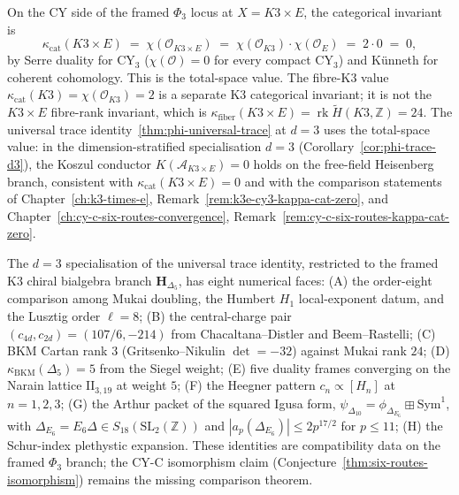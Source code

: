 \begin{remark}[\texorpdfstring{$\kappa_{\mathrm{cat}}(K3 \times E) = 0$}{kappa-cat(K3 x E) = 0}: per-route-independent CY-side invariant]
\label{rem:phiutp-kappa-cat-zero}
On the CY side of the framed $\Phi_3$ locus at $X = K3 \times E$, the categorical invariant is
\[
 \kappa_{\mathrm{cat}}(K3 \times E) \;=\; \chi(\mathcal{O}_{K3 \times E}) \;=\; \chi(\mathcal{O}_{K3}) \cdot \chi(\mathcal{O}_E) \;=\; 2 \cdot 0 \;=\; 0,
\]
by Serre duality for CY$_3$ ($\chi(\mathcal{O}) = 0$ for every compact CY$_3$) and K\"unneth for coherent cohomology. This is the total-space value. The fibre-K3 value $\kappa_{\mathrm{cat}}(K3) = \chi(\mathcal{O}_{K3}) = 2$ is a separate K3 categorical invariant; it is not the $K3\times E$ fibre-rank invariant, which is $\kappa_{\mathrm{fiber}}(K3\times E)=\operatorname{rk}\widetilde H(K3,\mathbb Z)=24$. The universal trace identity~\eqref{thm:phi-universal-trace} at $d = 3$ uses the total-space value: in the dimension-stratified specialisation $d = 3$ (Corollary~\ref{cor:phi-trace-d3}), the Koszul conductor $K(\mathcal{A}_{K3 \times E}) = 0$ holds on the free-field Heisenberg branch, consistent with $\kappa_{\mathrm{cat}}(K3 \times E) = 0$ and with the comparison statements of Chapter~\ref{ch:k3-times-e}, Remark~\ref{rem:k3e-cy3-kappa-cat-zero}, and Chapter~\ref{ch:cy-c-six-routes-convergence}, Remark~\ref{rem:cy-c-six-routes-kappa-cat-zero}.
\end{remark}

\begin{remark}
\label{rem:phiutp-k3-branch-comparisons}
The \(d=3\) specialisation of the universal trace identity, restricted
to the framed K3 chiral bialgebra branch \(\mathbf H_{\Delta_5}\), has
eight numerical faces: (A) the order-eight comparison among Mukai
doubling, the Humbert \(H_1\) local-exponent datum, and the Lusztig order
\(\ell=8\); (B) the central-charge pair
\((c_{4d},c_{2d})=(107/6,-214)\) from Chacaltana--Distler and
Beem--Rastelli; (C) BKM Cartan rank \(3\) (Gritsenko--Nikulin
\(\det=-32\)) against Mukai rank \(24\); (D)
\(\kappa_{\mathrm{BKM}}(\Delta_5)=5\) from the Siegel weight; (E) five
duality frames converging on the Narain lattice \(\mathrm{II}_{3,19}\)
at weight \(5\); (F) the Heegner pattern \(c_n\propto[H_n]\) at
\(n=1,2,3\); (G) the Arthur packet of the squared Igusa form,
\(\psi_{\Delta_{10}}=\phi_{\Delta_{E_6}}\boxplus\mathrm{Sym}^1\), with
\(\Delta_{E_6}=E_6\Delta\in S_{18}(\mathrm{SL}_2(\mathbb Z))\) and
\(|a_p(\Delta_{E_6})|\leq 2p^{17/2}\) for \(p\leq 11\); (H) the Schur-index
plethystic expansion. These identities are compatibility data on the
framed \(\Phi_3\) branch; the CY-C isomorphism claim
(Conjecture~\ref{thm:six-routes-isomorphism}) remains the missing
comparison theorem.
\end{remark}

